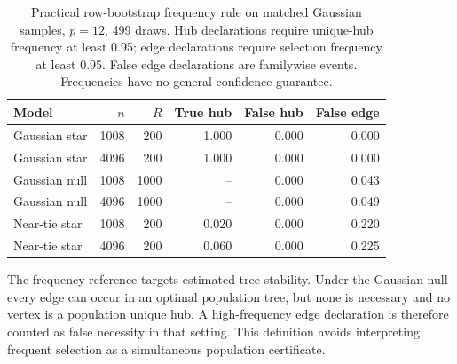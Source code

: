 \begin{table}[htbp]\centering\small
\setlength{\tabcolsep}{4pt}
\caption{Practical row-bootstrap frequency rule on matched Gaussian samples, $p=12$, 499 draws. Hub declarations require unique-hub frequency at least 0.95; edge declarations require selection frequency at least 0.95. False edge declarations are familywise events. Frequencies have no general confidence guarantee.}\label{tab:frequency}
\begin{lrbox}{\resultsbox}\begin{tabular}{lrrrrr}
\toprule
Model & $n$ & $R$ & True hub & False hub & False edge\\
\midrule
Gaussian star & 1008 & 200 & 1.000 & 0.000 & 0.000\\
Gaussian star & 4096 & 200 & 1.000 & 0.000 & 0.000\\
Gaussian null & 1008 & 1000 & -- & 0.000 & 0.043\\
Gaussian null & 4096 & 1000 & -- & 0.000 & 0.049\\
Near-tie star & 1008 & 200 & 0.020 & 0.000 & 0.220\\
Near-tie star & 4096 & 200 & 0.060 & 0.000 & 0.225\\
\bottomrule\end{tabular}\end{lrbox}\ifdim\wd\resultsbox>\linewidth\resizebox{\linewidth}{!}{\usebox{\resultsbox}}\else\usebox{\resultsbox}\fi\end{table}
The frequency reference targets estimated-tree stability. Under the Gaussian null every edge can occur in an optimal population tree, but none is necessary and no vertex is a population unique hub. A high-frequency edge declaration is therefore counted as false necessity in that setting. This definition avoids interpreting frequent selection as a simultaneous population certificate.
